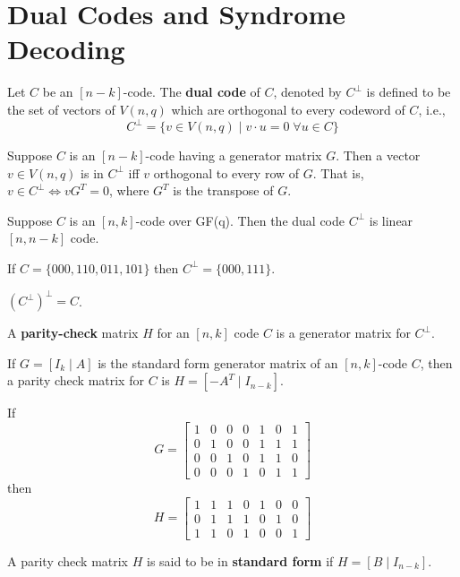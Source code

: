 \documentclass{article}
\begin{document}
\section{Dual Codes and Syndrome Decoding}
\begin{definition}
  Let \( C \) be an \( [n-k] \)-code. The \textbf{dual code} of \( C \), denoted by \( C^\perp \) is defined to be the set of vectors of \( V(n, q) \) which are orthogonal to every codeword of \( C \), i.e., \[
    C^\perp = \{v \in V(n, q) \mid v \cdot u = 0 \; \forall u \in C\}
  \]
\end{definition}
\begin{lemma}
  Suppose \( C \) is an \( [n-k] \)-code having a generator matrix \( G \). Then a vector \( v \in V(n, q) \) is in \( C^\perp  \) iff \( v \) orthogonal to every row of \( G \). That is, \( v \in  C^\perp \iff  vG^T = 0 \), where \( G^T \) is the transpose of \( G \).
\end{lemma}
\begin{theorem}
  Suppose \( C \) is an \( [n, k] \)-code over GF(q). Then the dual code \( C^\perp  \) is linear \( [n, n-k] \) code.
\end{theorem}
\begin{example}
  If \( C =\{000, 110, 011, 101\}  \) then \( C^\perp = \{000, 111\}  \).
\end{example}
\begin{theorem}
  \( (C^\perp )^\perp  = C\).
\end{theorem}
\begin{definition}
  A \textbf{parity-check} matrix \( H \) for an \( [n, k] \) code \( C \) is a generator matrix for \( C^\perp  \).
\end{definition}
\begin{theorem}
  If \( G = [I_k \mid A] \) is the standard form generator matrix of an \( [n, k] \)-code \( C \), then a parity check matrix for \( C \) is \( H = [-A^T \mid I_{n-k} ] \).
\end{theorem}
\begin{example}
  If \[
    G = \begin{bmatrix}
      1 & 0 & 0 & 0 & 1 & 0 & 1 \\
      0 & 1 & 0 & 0 & 1 & 1 & 1 \\
      0 & 0 & 1 & 0 & 1 & 1 & 0 \\
      0 & 0 & 0 & 1 & 0 & 1 & 1
    \end{bmatrix}
  \] then \[
    H = \begin{bmatrix}
      1 & 1 & 1 & 0 & 1 & 0 & 0 \\
      0 & 1 & 1 & 1 & 0 & 1 & 0 \\
      1 & 1 & 0 & 1 & 0 & 0 & 1
    \end{bmatrix}
  \]
\end{example}
\begin{definition}
  A parity check matrix \( H \) is said to be in \textbf{standard form} if \( H = [B \mid I_{n-k} ] \).
\end{definition}
\end{document}
